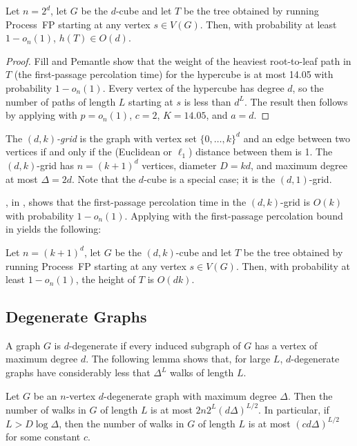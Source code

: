 \documentclass[lotsofwhite]{patmorin}
\begin{document}
\begin{thm}
  Let $n=2^d$, let $G$ be the $d$-cube and let $T$ be the tree obtained
  by running Process~FP starting at any vertex $s\in V(G)$.  Then,
  with probability at least $1-o_n(1)$, $h(T)\in O(d)$.
\end{thm}

\begin{proof}
  Fill and Pemantle \cite{fill.pemantle:percolation} show that the weight of
  the heaviest root-to-leaf path in $T$ (the first-passage percolation
  time) for the hypercube is at most 14.05 with probability $1-o_n(1)$.
  Every vertex of the hypercube has degree $d$, so the number of paths
  of length $L$ starting at $s$ is less than $d^L$.  The result then follows
  by applying  with $p=o_n(1)$, $c=2$, $K=14.05$,
  and $a=d$.
\end{proof}

The \emph{$(d,k)$-grid} is the graph with vertex set $\{0,\ldots,k\}^d$
and an edge between two vertices if and only if the (Euclidean or
$\ell_1$) distance between them is 1.  The $(d,k)$-grid has $n=(k+1)^d$
vertices, diameter $D=kd$, and maximum degree at most $\Delta=2d$. Note
that the $d$-cube is a special case; it is the $(d,1)$-grid.

, in , shows that
the first-passage percolation time in the $(d,k)$-grid is $O(k)$ with
probability $1-o_n(1)$.  Applying  with 
the first-passage percolation bound in  yields
the following:

\begin{cor}
  Let $n=(k+1)^d$, let $G$ be the $(d,k)$-cube and let $T$ be the tree obtained
  by running Process~FP starting at any vertex $s\in V(G)$.  Then,
  with probability at least $1-o_n(1)$, the height of $T$ is $O(dk)$.
\end{cor}



\subsection{Degenerate Graphs}

A graph $G$ is $d$-degenerate if every induced subgraph of $G$ has
a vertex of maximum degree $d$.  The following lemma shows that, for
large $L$, $d$-degenerate graphs have considerably less that $\Delta^L$
walks of length $L$.

\begin{lem}
   Let $G$ be an $n$-vertex $d$-degenerate graph with maximum degree
   $\Delta$.  Then the number of walks in $G$ of length $L$ is at most
   $2n2^{L}(d\Delta)^{L/2}$.  In particular, if $L > D\log\Delta$, then
   the number of walks in $G$ of length $L$ is at most $(cd\Delta)^{L/2}$
   for some constant $c$.
\end{lem}
\end{document}
